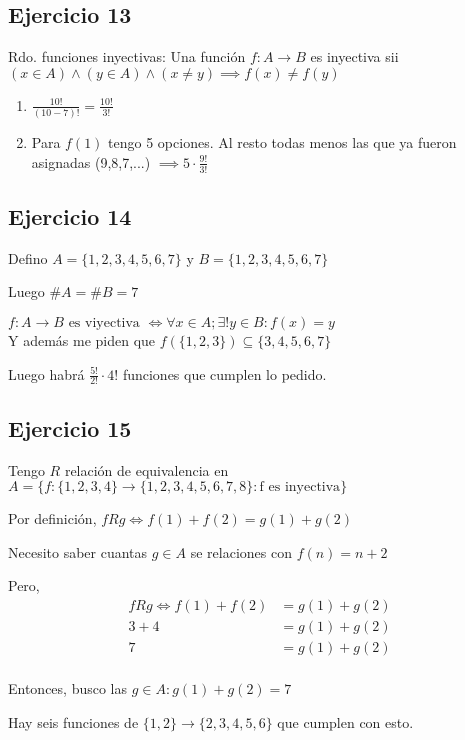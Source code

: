 \subsection{Ejercicio 13}
Rdo. funciones inyectivas: Una función $f: A\rightarrow B$ es inyectiva sii $ (x \in A) \wedge (y \in A) \wedge (x\neq y) \implies f(x) \neq f(y)$ 

\begin{enumerate}
    \item $\frac{10!}{(10-7)!} = \frac{10!}{3!}$
    \item Para $f(1)$ tengo 5 opciones. Al resto todas menos las que ya fueron asignadas (9,8,7,...) $ \implies 5 \cdot \frac{9!}{3!}$
\end{enumerate}

\subsection{Ejercicio 14}
Defino $A = \{ 1,2,3,4,5,6,7 \}$ y $B = \{ 1,2,3,4,5,6,7 \}$

Luego $\#A = \#B = 7$

$f: A \rightarrow B \text{ es viyectiva } \iff \forall x \in A; \exists ! y \in B: f(x) = y$ \\
Y además me piden que $ f(\{ 1,2,3 \}) \subseteq \{ 3,4,5,6,7 \} $

Luego habrá $ \frac{5!}{2!} \cdot 4! $ funciones que cumplen lo pedido.

\subsection{Ejercicio 15}
Tengo $R$ relación de equivalencia en $A=\{ f: \{ 1,2,3,4 \} \rightarrow \{ 1,2,3,4,5,6,7,8 \}: \text{f es inyectiva} \}$

Por definición, $fRg \iff f(1) + f(2) = g(1) + g(2)$

Necesito saber cuantas $g \in A$ se relaciones con $ f(n) = n+2 $

Pero,
\begin{align*}
    fRg \iff f(1) + f(2) &= g(1) + g(2) \\
    3+4 &= g(1) + g(2) \\
    7 &= g(1) + g(2) \\
\end{align*}

Entonces, busco las $g \in A: g(1) + g(2) = 7$ 

Hay seis funciones de $\{ 1,2 \} \rightarrow \{ 2,3,4,5,6 \}$ que cumplen con esto.

